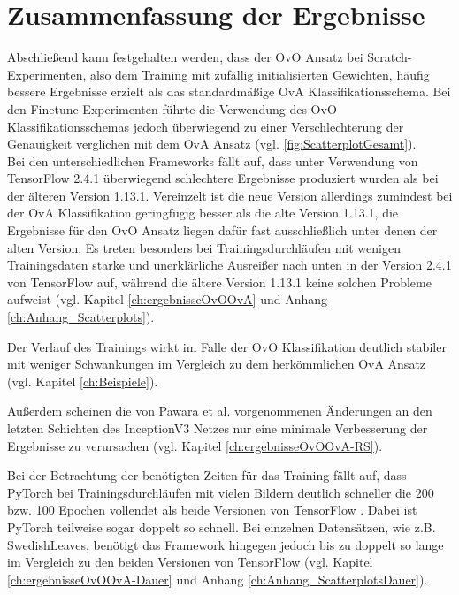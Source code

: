 \section{Zusammenfassung der Ergebnisse}
Abschließend kann festgehalten werden, dass der OvO Ansatz bei Scratch-Experimenten, also dem Training mit zufällig initialisierten Gewichten, häufig bessere Ergebnisse erzielt als das standardmäßige OvA Klassifikationsschema. Bei den Finetune-Experimenten führte die Verwendung des OvO Klassifikationsschemas jedoch überwiegend zu einer Verschlechterung der Genauigkeit verglichen mit dem OvA Ansatz (vgl. \ref{fig:ScatterplotGesamt}).\\

Bei den unterschiedlichen Frameworks fällt auf, dass unter Verwendung von TensorFlow 2.4.1 \cite{tensorflow} überwiegend schlechtere Ergebnisse produziert wurden als bei der älteren Version 1.13.1. Vereinzelt ist die neue Version allerdings zumindest bei der OvA Klassifikation geringfügig besser als die alte Version 1.13.1, die Ergebnisse für den OvO Ansatz liegen dafür fast ausschließlich unter denen der alten Version. Es treten besonders bei Trainingsdurchläufen mit wenigen Trainingsdaten starke und unerklärliche Ausreißer nach unten in der Version 2.4.1 von TensorFlow \cite{tensorflow} auf, während die ältere Version 1.13.1 keine solchen Probleme aufweist (vgl. Kapitel \ref{ch:ergebnisseOvOOvA} und Anhang \ref{ch:Anhang_Scatterplots}).

Der Verlauf des Trainings wirkt im Falle der OvO Klassifikation deutlich stabiler mit weniger Schwankungen im Vergleich zu dem herkömmlichen OvA Ansatz (vgl. Kapitel \ref{ch:Beispiele}).

Außerdem scheinen die von Pawara et al. \cite{pawaraWebsiteCode} vorgenommenen Änderungen an den letzten Schichten des InceptionV3 Netzes nur eine minimale Verbesserung der Ergebnisse zu verursachen (vgl. Kapitel \ref{ch:ergebnisseOvOOvA-RS}).

Bei der Betrachtung der benötigten Zeiten für das Training fällt auf, dass PyTorch \cite{pytorch} bei Trainingsdurchläufen mit vielen Bildern deutlich schneller die 200 bzw. 100 Epochen vollendet als beide Versionen von TensorFlow \cite{tensorflow}. Dabei ist PyTorch \cite{pytorch} teilweise sogar doppelt so schnell. Bei einzelnen Datensätzen, wie z.B. SwedishLeaves, benötigt das Framework hingegen jedoch bis zu doppelt so lange im Vergleich zu den beiden Versionen von TensorFlow \cite{tensorflow} (vgl. Kapitel \ref{ch:ergebnisseOvOOvA-Dauer} und Anhang \ref{ch:Anhang_ScatterplotsDauer}).\\\\
